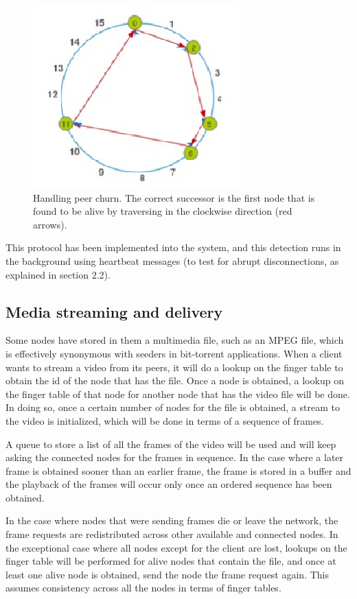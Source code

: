 \documentclass[fleqn,24pt]{SelfArx} %
\begin{document}
\begin{figure}[!htb]
\includegraphics{stabilize1.png}
\caption{\label{family}Handling peer churn. The correct successor is the first node that is found to be alive by traversing in the clockwise direction (red arrows).}
\label{5}
\end{figure}

This protocol has been implemented into the system, and this detection runs in the background using heartbeat messages (to test for abrupt disconnections, as explained in section 2.2). 

\subsection{Media streaming and delivery}

Some nodes have stored in them a multimedia file, such as an MPEG file, which is effectively synonymous with seeders in bit-torrent applications. When a client wants to stream a video from its peers, it will do a lookup on the finger table to obtain the id of the node that has the file. Once a node is obtained, a lookup on the finger table of that node for another node that has the video file will be done. In doing so, once a certain number of nodes for the file is obtained, a stream to the video is initialized, which will be done in terms of a sequence of frames. 

A queue to store a list of all the frames of the video will be used and will keep asking the connected nodes for the frames in sequence. In the case where a later frame is obtained sooner than an earlier frame, the frame is stored in a buffer and the playback of the frames will occur only once an ordered sequence has been obtained. 

In the case where nodes that were sending frames die or leave the network, the frame requests are redistributed across other available and connected nodes. In the exceptional case where all nodes except for the client are lost, lookups on the finger table will be performed for alive nodes that contain the file, and once at least one alive node is obtained, send the node the frame request again. This assumes consistency across all the nodes in terms of finger tables.
\end{document}
